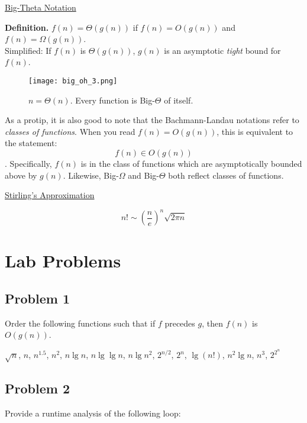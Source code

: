 \begin{framed}
    \begin{center}
        \underline{Big-Theta Notation}
    \end{center}
    \textbf{Definition.} $f(n) = \Theta(g(n))$ if $f(n) = O(g(n))$ and $f(n) = \Omega(g(n))$.\\

    Simplified: If $f(n)$ is $\Theta(g(n))$, $g(n)$ is an asymptotic \textit{tight} bound for $f(n)$.
\end{framed}

\begin{figure}[h]
    \centering
    \texttt{[image: big\_oh\_3.png]}
    \caption*{$n = \Theta(n)$. Every function is Big-$\Theta$ of itself.}
\end{figure}

As a protip, it is also good to note that the Bachmann-Landau notations refer to \textit{classes of functions}. When you read $f(n) = O(g(n))$, this is equivalent to the statement: $$f(n) \in O(g(n))$$. Specifically, $f(n)$ is in the class of functions which are asymptotically bounded above by $g(n)$. Likewise, Big-$\Omega$ and Big-$\Theta$ both reflect classes of functions.

\begin{framed}
    \begin{center}
        \underline{Stirling's Approximation}
    \end{center}
    $$n! \sim (\frac{n}{e})^n \sqrt{2\pi n}$$
\end{framed}

\section*{Lab Problems}

\subsection*{Problem 1}
Order the following functions such that if $f$ precedes $g$, then $f(n)$ is $O(g(n))$.

\begin{center}
    $\sqrt{n}$, $n$, $n^{1.5}$, $n^2$, $n \lg{n}$, $n\lg\lg{n}$, $n\lg{n^2}$, $2^{n/2}$, $2^n$, $\lg(n!)$, $n^2\lg{n}$, $n^3$, $2^{2^n}$
\end{center}

\subsection*{Problem 2}
Provide a runtime analysis of the following loop:

